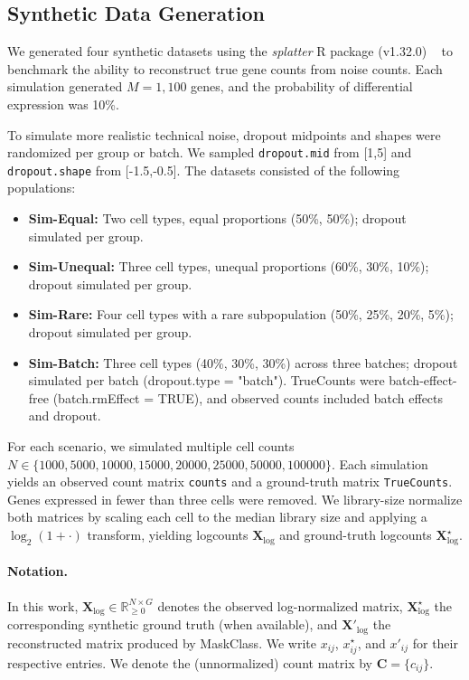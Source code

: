 \documentclass[sigconf,review]{acmart}
\theoremstyle{plain}
\theoremstyle{definition}
\theoremstyle{remark}
\newenvironment{compitemize}
  {\begin{itemize}[noitemsep, topsep=0pt, parsep=0pt, partopsep=0pt]}
  {\end{itemize}}
\begin{document}
\subsection{Synthetic Data Generation}
\label{sec:synthetic_data}
We generated four synthetic datasets using the \textit{splatter} R package (v1.32.0) ~\cite{zappia2017splatter} to benchmark the ability to reconstruct true gene counts from noise counts. Each simulation generated $M=1{,}100$ genes, and the probability of differential expression was 10\%.

To simulate more realistic technical noise, dropout midpoints and shapes were randomized per group or batch. We sampled
\texttt{dropout.\allowbreak mid} from [1,5] and \texttt{dropout.\allowbreak shape} from [-1.5,-0.5].
The datasets consisted of the following populations:
\begin{compitemize}
\item \textbf{Sim-Equal:} Two cell types, equal proportions (50\%, 50\%); dropout simulated per group.
\item \textbf{Sim-Unequal:} Three cell types, unequal proportions (60\%, 30\%, 10\%); dropout simulated per group.
\item \textbf{Sim-Rare:} Four cell types with a rare subpopulation (50\%, 25\%, 20\%, 5\%); dropout simulated per group.
\item \textbf{Sim-Batch:} Three cell types (40\%, 30\%, 30\%) across three batches; dropout simulated per batch (dropout.type = "batch"). TrueCounts were batch-effect-free (batch.rmEffect = TRUE), and observed counts included batch effects and dropout.
\end{compitemize}

For each scenario, we simulated multiple cell counts
$N\in\{1000, 5000, 10000, 15000, 20000, 25000, 50000, 100000\}$. Each
simulation yields an observed count matrix \texttt{counts} and a ground-truth
matrix \texttt{TrueCounts}. Genes expressed in fewer than three cells were
removed. We library-size normalize both matrices by scaling each cell to the
median library size and applying a $\log_2(1+\cdot)$ transform, yielding
logcounts $\mathbf{X}_{\log}$ and ground-truth logcounts
$\mathbf{X}^{\star}_{\log}$.

\paragraph{Notation.}
In this work, $\mathbf{X}_{\log}\in\mathbb{R}_{\ge 0}^{N\times G}$ denotes the
observed log-normalized matrix, $\mathbf{X}^{\star}_{\log}$ the corresponding
synthetic ground truth (when available), and $\mathbf{X}'_{\log}$ the
reconstructed matrix produced by MaskClass. We write $x_{ij}$, $x^{\star}_{ij}$,
and $x'_{ij}$ for their respective entries. We denote the (unnormalized) count
matrix by $\mathbf{C}=\{c_{ij}\}$.
\end{document}

